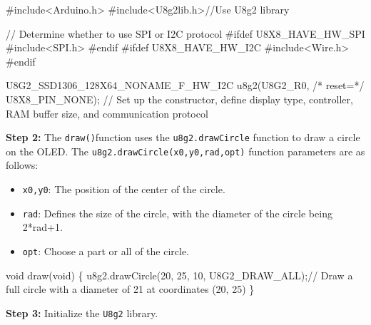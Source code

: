 \documentclass[
  letterpaper,
  DIV=11,
  numbers=noendperiod]{scrreprt}
\newenvironment{Shaded}{\begin{snugshade}}{\end{snugshade}}
\newcommand{\CommentTok}[1]{\textcolor[rgb]{0.37,0.37,0.37}{#1}}
\newcommand{\DataTypeTok}[1]{\textcolor[rgb]{0.68,0.00,0.00}{#1}}
\newcommand{\DecValTok}[1]{\textcolor[rgb]{0.68,0.00,0.00}{#1}}
\newcommand{\ImportTok}[1]{\textcolor[rgb]{0.00,0.46,0.62}{#1}}
\newcommand{\NormalTok}[1]{\textcolor[rgb]{0.00,0.23,0.31}{#1}}
\newcommand{\OperatorTok}[1]{\textcolor[rgb]{0.37,0.37,0.37}{#1}}
\newcommand{\PreprocessorTok}[1]{\textcolor[rgb]{0.68,0.00,0.00}{#1}}
\providecommand{\tightlist}{%
  \setlength{\itemsep}{0pt}\setlength{\parskip}{0pt}}\usepackage{longtable,booktabs,array}
\begin{document}
\begin{Shaded}
\begin{Highlighting}[]
\PreprocessorTok{\#include}\ImportTok{\textless{}Arduino.h\textgreater{}}
\PreprocessorTok{\#include}\ImportTok{\textless{}U8g2lib.h\textgreater{}}\CommentTok{//Use U8g2 library}

\CommentTok{// Determine whether to use SPI or I2C protocol}
\PreprocessorTok{\#ifdef U8X8\_HAVE\_HW\_SPI}
\PreprocessorTok{\#include}\ImportTok{\textless{}SPI.h\textgreater{}}
\PreprocessorTok{\#endif}
\PreprocessorTok{\#ifdef U8X8\_HAVE\_HW\_I2C}
\PreprocessorTok{\#include}\ImportTok{\textless{}Wire.h\textgreater{}}
\PreprocessorTok{\#endif}

\NormalTok{U8G2\_SSD1306\_128X64\_NONAME\_F\_HW\_I2C u8g2}\OperatorTok{(}\NormalTok{U8G2\_R0}\OperatorTok{,} \CommentTok{/* reset=*/}\NormalTok{ U8X8\_PIN\_NONE}\OperatorTok{);}
\CommentTok{// Set up the constructor, define display type, controller, RAM buffer size, and communication protocol}
\end{Highlighting}
\end{Shaded}

\textbf{Step 2:} The \texttt{draw()}function uses the
\texttt{u8g2.drawCircle} function to draw a circle on the OLED. The
\texttt{u8g2.drawCircle(x0,y0,rad,opt)} function parameters are as
follows:

\begin{itemize}
\tightlist
\item
  \texttt{x0,y0}: The position of the center of the circle.
\item
  \texttt{rad}: Defines the size of the circle, with the diameter of the
  circle being 2*rad+1.
\item
  \texttt{opt}: Choose a part or all of the circle.
\end{itemize}

\begin{Shaded}
\begin{Highlighting}[]
\DataTypeTok{void}\NormalTok{ draw}\OperatorTok{(}\DataTypeTok{void}\OperatorTok{)} \OperatorTok{\{} 
\NormalTok{    u8g2}\OperatorTok{.}\NormalTok{drawCircle}\OperatorTok{(}\DecValTok{20}\OperatorTok{,} \DecValTok{25}\OperatorTok{,} \DecValTok{10}\OperatorTok{,}\NormalTok{ U8G2\_DRAW\_ALL}\OperatorTok{);}\CommentTok{// Draw a full circle with a diameter of 21 at coordinates (20, 25)}
\OperatorTok{\}}
\end{Highlighting}
\end{Shaded}

\textbf{Step 3:} Initialize the \texttt{U8g2} library.
\end{document}
